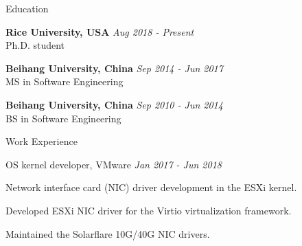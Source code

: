 \documentclass{resume} %
\begin{document}

\begin{rSection}{Education}

{\bf Rice University, USA} \hfill {\em Aug 2018 - Present}
\\ Ph.D. student

{\bf Beihang University, China} \hfill {\em Sep 2014 - Jun 2017}
\\ MS in Software Engineering

{\bf Beihang University, China} \hfill {\em Sep 2010 - Jun 2014}
\\ BS in Software Engineering

\end{rSection}



\begin{rSection}{Work Experience}

\begin{rSubsection}{OS kernel developer, VMware} {\em Jan 2017 - Jun 2018}
{}{}
\item Network interface card (NIC) driver development in the ESXi kernel.
\item Developed ESXi NIC driver for the Virtio virtualization framework.
\item Maintained the Solarflare 10G/40G NIC drivers.
\end{rSubsection}

\end{rSection}

\end{document}
